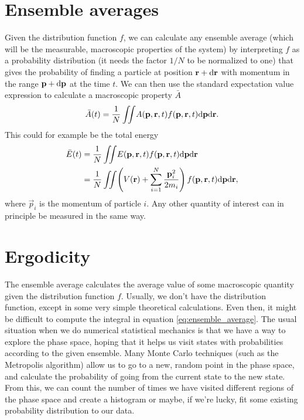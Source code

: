 \section{Ensemble averages}
\label{sec:kinetic_theory_ensemble_averages}
Given the distribution function $f$, we can calculate any ensemble average (which will be the measurable, macroscopic properties of the system) by interpreting $f$ as a probability distribution (it needs the factor $1/N$ to be normalized to one) that gives the probability of finding a particle at position $\mathbf r + \mathrm{d}\mathbf r$ with momentum in the range $\mathbf p + \mathrm{d}\mathbf p$ at the time $t$. We can then use the standard expectation value expression to calculate a macroscopic property $\bar A$
\begin{align}
	\label{eq:ensemble_average}
	\bar A(t) = \frac{1}{ N}\iint\! A(\mathbf p, \mathbf r, t)f(\mathbf p, \mathbf r, t)\mathrm{d}\mathbf p\mathrm{d}\mathbf r.
\end{align}
This could for example be the total energy
\begin{align}
	\bar E(t) &= \frac{1}{ N}\iint\! E(\mathbf p, \mathbf r, t)f(\mathbf p, \mathbf r, t)\mathrm{d}\mathbf p\mathrm{d}\mathbf r \\
	&= \frac{1}{ N}\iint\! \left(V(\mathbf r) + \sum_{i=1}^N \frac{\mathbf p_i^2}{2m_i} \right)f(\mathbf p, \mathbf r, t)\mathrm{d}\mathbf p \mathrm{d}\mathbf r,
\end{align}
where $\vec p_i$ is the momentum of particle $i$. Any other quantity of interest can in principle be measured in the same way. 

\section{Ergodicity}
\label{sec:kinetic_theory_ergodicity}
The ensemble average calculates the average value of some macroscopic quantity given the distribution function $f$. Usually, we don't have the distribution function, except in some very simple theoretical calculations. Even then, it might be difficult to compute the integral in equation \eqref{eq:ensemble_average}. The usual situation when we do numerical statistical mechanics is that we have a way to explore the phase space, hoping that it helps us visit states with probabilities according to the given ensemble. Many Monte Carlo techniques (such as the Metropolis algorithm) allow us to go to a new, random point in the phase space, and calculate the probability of going from the current state to the new state. From this, we can count the number of times we have visited different regions of the phase space and create a histogram or maybe, if we're lucky, fit some existing probability distribution to our data.

